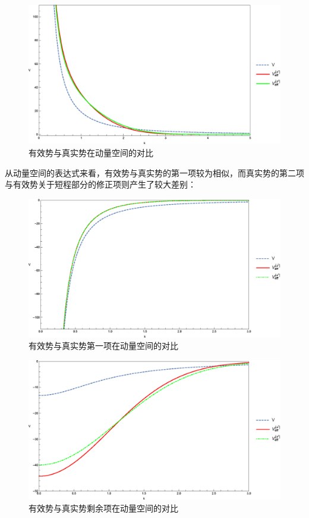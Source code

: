 \documentclass[hyperref,cs4size,titlepage,twoside]{ctexart}
\begin{document}
\clearpage
\begin{figure}[!htbp]
  \centering
  \includegraphics[width=6in]{FourierTransformation_1.eps}
  \caption{有效势与真实势在动量空间的对比}\label{TotalFourier}
\end{figure}
从动量空间的表达式来看，有效势与真实势的第一项较为相似，而真实势的第二项与有效势关于短程部分的修正项则产生了较大差别：
\begin{figure}[!htbp]
  \centering
  \includegraphics[width=6in]{FourierTransformation_2.eps}
  \caption{有效势与真实势第一项在动量空间的对比}
\end{figure}
\clearpage
\begin{figure}[!htbp]
  \centering
  \includegraphics[width=6in]{FourierTransformation_3.eps}
  \caption{有效势与真实势剩余项在动量空间的对比}
\end{figure}
\end{document}
